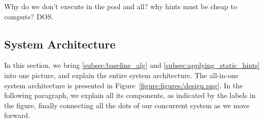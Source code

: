 \begin{remark}
	Why do we don't execute in the pool and all? why hints must be cheap to compute? DOS.
\end{remark}

\subsection{System Architecture}


In this section, we bring \ref{subsec:baseline_alg} and \ref{subsec:applying_static_hints} into one
picture, and explain the entire system architecture. 
The all-in-one
system architecture is presented in Figure~\ref{figure:figures/design.png}. In the following paragraph, we explain all its components, as indicated by the labels in the figure, finally connecting all the dots of our concurrent system as we
move forward.



